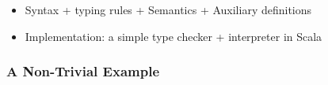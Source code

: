 \begin{comment}
$mbody(m, I)$ algorithm:
\begin{itemize}
	\item If m is defined in I directly, then return I.m()
	\item Else, let $\overline{I'} = mdefined(fathers(I))$, all ancestors of $I$ that has directly defined $m()$.
	\item $\overline{I''} = needed(\overline{I'})$, keep only interfaces that are needed, which are not super-interface of others.
	\item If $\overline{I''}$ is unique, then return this unique one. Else if any two I1,I2 in $\overline{I''}$ share a parent in $\overline{I'}$, then diamond conflict is detected, report error. Else return multiple $m()$s.
\end{itemize}
\end{comment}

\begin{comment}
\subsubsection{\collectMethods}
\[ \collectMethods(I) = \left( \bigcup_{I_i \in \overline{I}} \methods(I_i) \right) \bigcup \methods(I) \]
\[ \methods(I) = \overline{M}, \text{where } IT(I) = \interface{I}{I}{M} \]
\end{comment}

\begin{itemize}
	\item Syntax + typing rules + Semantics + Auxiliary definitions
	\item Implementation: a simple type checker + interpreter in Scala
\end{itemize}

\subsubsection{A Non-Trivial Example}

